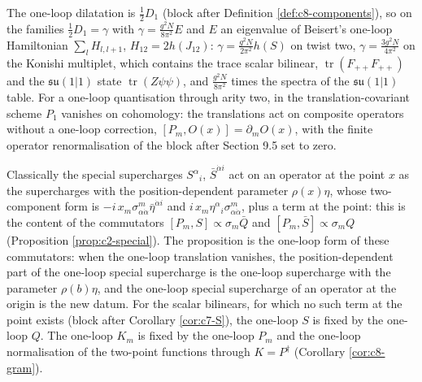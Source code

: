 \begin{remark}
The one-loop dilatation is $\tfrac12D_1$ (block after Definition \ref{def:c8-components}), so on the families $\tfrac12D_1=\gamma$ with $\gamma=\frac{g^2N}{8\pi^2}E$ and $E$ an eigenvalue of Beisert's one-loop Hamiltonian $\sum_lH_{l,l+1}$, $H_{12}=2h(J_{12})$: $\gamma=\frac{g^2N}{2\pi^2}h(S)$ on twist two, $\gamma=\frac{3g^2N}{4\pi^2}$ on the Konishi multiplet, which contains the trace scalar bilinear, $\operatorname{tr}(F_{++}F_{++})$ and the $\mathfrak{su}(1|1)$ state $\operatorname{tr}(Z\psi\psi)$, and $\frac{g^2N}{8\pi^2}$ times the spectra of the $\mathfrak{su}(1|1)$ table. For a one-loop quantisation through arity two, in the translation-covariant scheme $P_1$ vanishes on cohomology: the translations act on composite operators without a one-loop correction, $[P_m,O(x)]=\partial_mO(x)$, with the finite operator renormalisation of the block after Section 9.5 set to zero.
\end{remark}

\begin{remark}
Classically the special supercharges $S^\alpha{}_i$, $\bar S^{\dot\alpha i}$ act on an operator at the point $x$ as the supercharges with the position-dependent parameter $\rho(x)\eta$, whose two-component form is $-i\,x_m\sigma^m_{\alpha\dot\alpha}\bar\eta^{\dot\alpha i}$ and $i\,x_m\eta^\alpha{}_i\sigma^m_{\alpha\dot\alpha}$, plus a term at the point: this is the content of the commutators $[P_m,S]\propto\sigma_m\bar Q$ and $[P_m,\bar S]\propto\sigma_mQ$ (Proposition \ref{prop:c2-special}). The proposition is the one-loop form of these commutators: when the one-loop translation vanishes, the position-dependent part of the one-loop special supercharge is the one-loop supercharge with the parameter $\rho(b)\eta$, and the one-loop special supercharge of an operator at the origin is the new datum. For the scalar bilinears, for which no such term at the point exists (block after Corollary \ref{cor:c7-S}), the one-loop $S$ is fixed by the one-loop $Q$. The one-loop $K_m$ is fixed by the one-loop $P_m$ and the one-loop normalisation of the two-point functions through $K=P^\dagger$ (Corollary \ref{cor:c8-gram}).
\end{remark}

